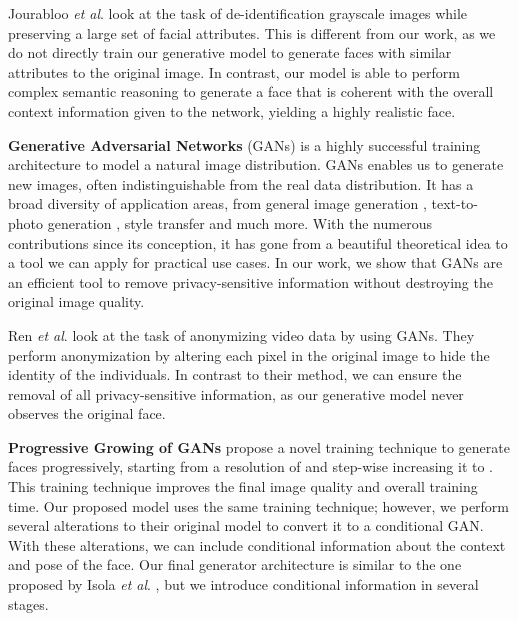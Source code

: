 \documentclass[runningheads]{llncs}
\newcommand{\etal}{\textit{et al}. }
\begin{document}
Jourabloo \etal \cite{Jourabloo2015AttributeDe-identification} look at the task of de-identification grayscale images while preserving a large set of facial attributes. This is different from our work, as we do not directly train our generative model to generate faces with similar attributes to the original image. In contrast, our model is able to perform complex semantic reasoning to generate a face that is coherent with the overall context information given to the network, yielding a highly realistic face.

\textbf{Generative Adversarial Networks} (GANs) \cite{Goodfellow2014} is a highly successful training architecture to model a natural image distribution. GANs enables us to  generate new images, often indistinguishable from the real data distribution. It has a broad diversity of application areas, from general image generation \cite{Brock2018,Karras2017,Karras2018ANetworks,Zhang2018}, text-to-photo generation \cite{Zhang2017}, style transfer \cite{Huang2017ArbitraryNormalization,Ruder2016} and much more. With the numerous contributions since its conception, it has gone from a beautiful theoretical idea to a tool we can apply for practical use cases. 
In our work, we show that GANs are an efficient tool to remove privacy-sensitive information without destroying the original image quality.

 Ren \etal \cite{Ren2018} look at the task of anonymizing video data by using GANs. They perform anonymization by altering each pixel in the original image to hide the identity of the individuals. In contrast to their method, we can ensure the removal of all privacy-sensitive information, as our generative model never observes the original face.

\textbf{Progressive Growing of GANs} \cite{Karras2017} propose a novel training technique to generate faces progressively, starting from a resolution of  and step-wise increasing it to . This training technique improves the final image quality and overall training time. Our proposed model uses the same training technique; however, we perform several alterations to their original model to convert it to a conditional GAN. With these alterations, we can include conditional information about the context and pose of the face.
Our final generator architecture is similar to the one proposed by Isola \etal \cite{Isola2017}, but we introduce conditional information in several stages. 
\end{document}
